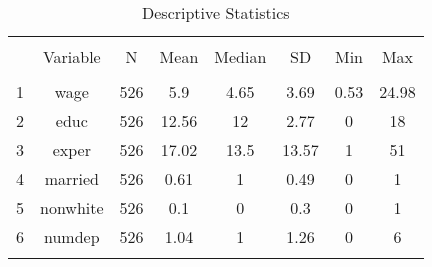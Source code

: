 
\begin{table}[!htbp] \centering 
  \caption{Descriptive Statistics} 
  \label{} 
\begin{tabular}{@{\extracolsep{5pt}} cccccccc} 
\\[-1.8ex]\hline 
\hline \\[-1.8ex] 
 & Variable & N & Mean & Median & SD & Min & Max \\ 
\hline \\[-1.8ex] 
1 & wage & 526 & 5.9 & 4.65 & 3.69 & 0.53 & 24.98 \\ 
2 & educ & 526 & 12.56 & 12 & 2.77 & 0 & 18 \\ 
3 & exper & 526 & 17.02 & 13.5 & 13.57 & 1 & 51 \\ 
4 & married & 526 & 0.61 & 1 & 0.49 & 0 & 1 \\ 
5 & nonwhite & 526 & 0.1 & 0 & 0.3 & 0 & 1 \\ 
6 & numdep & 526 & 1.04 & 1 & 1.26 & 0 & 6 \\ 
\hline \\[-1.8ex] 
\end{tabular} 
\end{table} 
